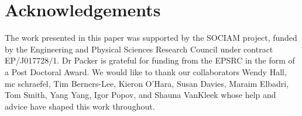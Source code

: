 \documentclass{sigchi}
\begin{document}




\section{Acknowledgements} 

The work presented in this paper was supported by the SOCIAM project, funded by the Engineering and Physical Sciences Research Council under contract EP/J017728/1. Dr Packer is grateful for funding from the EPSRC in the form of a Post Doctoral Award.  We would like to thank our collaborators Wendy Hall, mc schraefel, Tim Berners-Lee, Kieron O'Hara, Susan Davies, Maraim Elbadri, Tom Smith, Yang Yang, Igor Popov, and Shauna VanKleek whose help and advice have shaped this work throughout.

\end{document}
